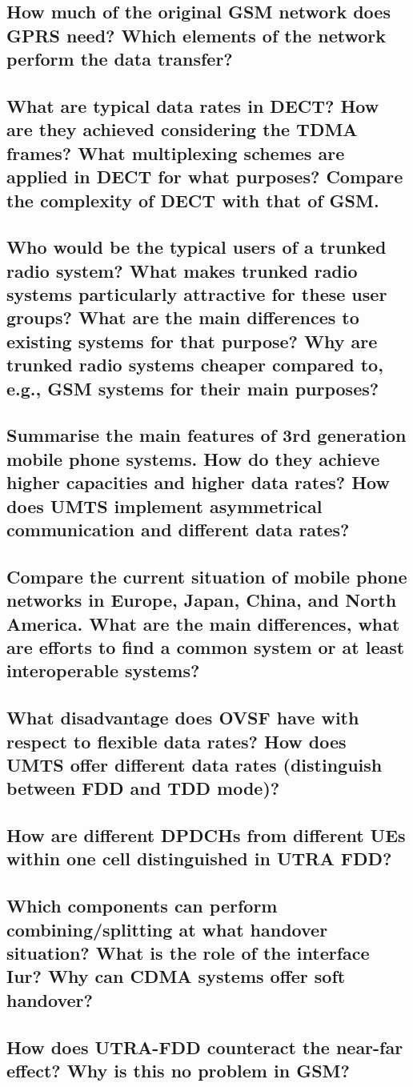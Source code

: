 \subsection{How much of the original GSM network does GPRS need? Which elements of the
network perform the data transfer?}

\subsection{What are typical data rates in DECT? How are they achieved considering the TDMA
frames? What multiplexing schemes are applied in DECT for what purposes?
Compare the complexity of DECT with that of GSM.}

\subsection{Who would be the typical users of a trunked radio system? What makes trunked radio
systems particularly attractive for these user groups? What are the main differences
to existing systems for that purpose? Why are trunked radio systems cheaper
compared to, e.g., GSM systems for their main purposes?}

\subsection{Summarise the main features of 3rd generation mobile phone systems. How do they
achieve higher capacities and higher data rates? How does UMTS implement
asymmetrical communication and different data rates?}

\subsection{Compare the current situation of mobile phone networks in Europe, Japan, China,
and North America. What are the main differences, what are efforts to find a common
system or at least interoperable systems?}

\subsection{What disadvantage does OVSF have with respect to flexible data rates? How does
UMTS offer different data rates (distinguish between FDD and TDD mode)?}

\subsection{How are different DPDCHs from different UEs within one cell distinguished in UTRA
FDD?}

\subsection{Which components can perform combining/splitting at what handover situation? What
is the role of the interface Iur? Why can CDMA systems offer soft handover?}

\subsection{How does UTRA-FDD counteract the near-far effect? Why is this no problem in
GSM?}


